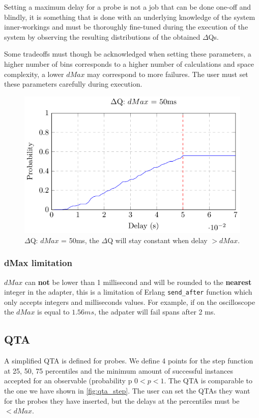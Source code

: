    Setting a maximum delay for a probe is not a job that can be done one-off and blindly, it is something that is done with an underlying knowledge of the system inner-workings and must be thoroughly fine-tuned during the execution of the system by observing the resulting distributions of the obtained $\Delta$Qs. \label{subsec:dMax}

    Some tradeoffs must though be acknowledged when setting these parameters, a higher number of bins corresponds to a higher number of calculations and space complexity, a lower $dMax$ may correspond to more failures. The user must set these parameters carefully during execution.

    \begin{figure}[H]
        \begin{center}
            \includegraphics[scale = 1]{tikz/cdf_dmax.pdf}
        \end{center}
        \caption{$\Delta$Q: $dMax$ = 50ms, the $\Delta$Q will stay constant when delay $> dMax$.}
    \end{figure}

    \subsubsection{dMax limitation}
        $dMax$ can \textbf{not} be lower than 1 millisecond and will be rounded to the \textbf{nearest} integer in the adapter, this is a limitation of Erlang \texttt{send\_after} function which only accepts integers and milliseconds values. For example, if on the oscilloscope the $dMax$ is equal to $1.56 ms$, the adpater will fail spans after 2 ms.

    \subsection{QTA}
        A simplified QTA is defined for probes. We define 4 points for the step function at 25, 50, 75 percentiles and the minimum amount of successful instances accepted for an observable (probability p $0 < p < 1$. The QTA is comparable to the one we have shown in \cref{fig:qta_step}. The user can set the QTAs they want for the probes they have inserted, but the delays at the percentiles must be $< dMax$. \label{subsec:qta_i}

